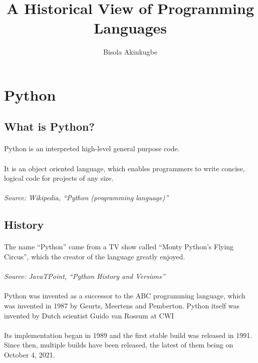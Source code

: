 \documentclass{article}
\begin{document}
	\title{A Historical View of Programming Languages}
	\author{Bisola Akinkugbe}
	\maketitle
	\section{Python}
	\subsection{What is Python?}
	\paragraph{}Python is an interpreted high-level general purpose code.
	\paragraph{} It is an object oriented language, which enables programmers to write concise, logical code for projects of any size.
	\paragraph{} \textit{Source: Wikipedia, “Python (programming language)”}
	\subsection{History}
	\paragraph{}The name “Python” came from a TV show called “Monty Python’s Flying Circus”, which the creator of the language greatly enjoyed.
	\paragraph{}\textit{Source: JavaTPoint, “Python History and Versions”} \paragraph{}Python was invented as a successor to the ABC programming language, which was invented in 1987 by Geurts, Meertens and Pemberton.
	Python itself was invented by Dutch scientist Guido van Rossum at CWI 
	\paragraph{}Its implementation began in 1989 and the first stable build was released in 1991.
	Since then, multiple builds have been released, the latest of them being on October 4, 2021.
\end{document}
